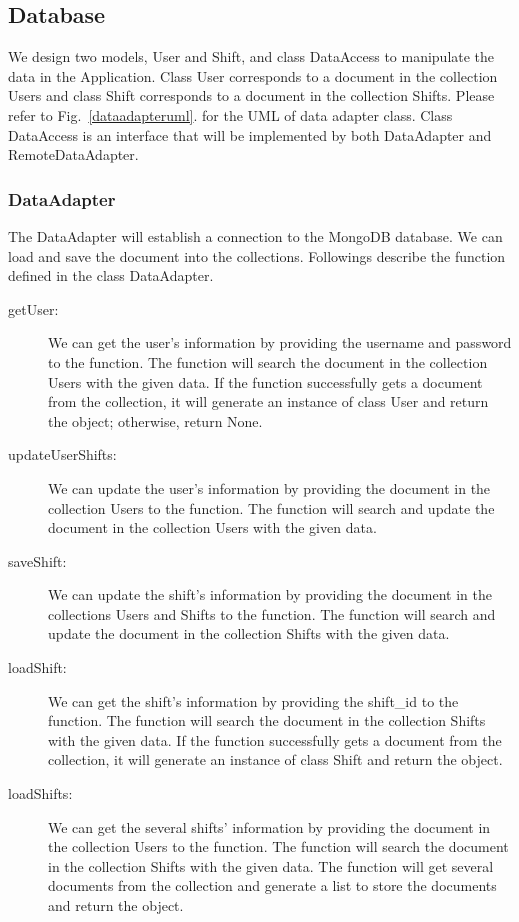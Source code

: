 \documentclass[11pt, oneside]{article}   	%
\begin{document}
\subsection{Database}
We design two models, User and Shift, and class DataAccess to manipulate the data in the Application.
Class User corresponds to a document in the collection Users and class Shift corresponds to a document in the collection Shifts.
Please refer to Fig.~\ref{dataadapteruml}. for the UML of data adapter class.
Class DataAccess is an interface that will be implemented by both DataAdapter and RemoteDataAdapter.

\subsubsection{DataAdapter}
The DataAdapter will establish a connection to the MongoDB database. We can load and save the document into the collections. Followings describe the function defined in the class DataAdapter.
\begin{description}
\item[getUser:]We can get the user’s information by providing the username and password to the function. The function will search the document in the collection Users with the given data. If the function successfully gets a document from the collection, it will generate an instance of class User and return the object; otherwise, return None.
\item[updateUserShifts:]We can update the user’s information by providing the document in the collection Users to the function. The function will search and update the document in the collection Users with the given data.
\item[saveShift:]We can update the shift’s information by providing the document in the collections Users and Shifts to the function. The function will search and update the document in the collection Shifts with the given data.
\item[loadShift:]We can get the shift’s information by providing the shift\_id to the function. The function will search the document in the collection Shifts with the given data. If the function successfully gets a document from the collection, it will generate an instance of class Shift and return the object.
\item[loadShifts:]We can get the several shifts’ information by providing the document in the collection Users to the function. The function will search the document in the collection Shifts with the given data. The function will get several documents from the collection and generate a list to store the documents and return the object.
\end{description}
\end{document}
